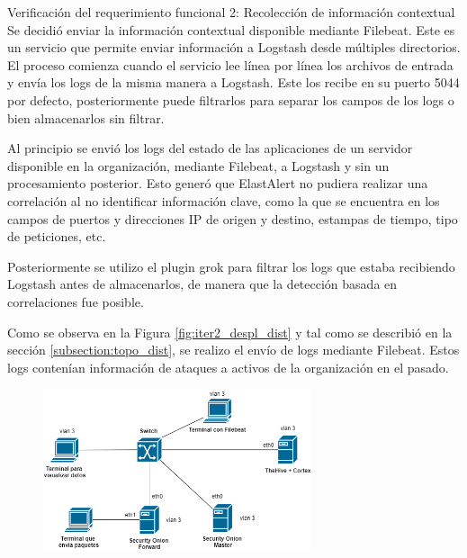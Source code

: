 \begin{section}{Verificación del requerimiento funcional 2: Recolección de información contextual}
    Se decidió enviar la información contextual disponible mediante Filebeat. Este es un servicio que permite enviar información a Logstash desde múltiples directorios. El proceso comienza cuando el servicio lee línea por línea los archivos de entrada y envía los logs de la misma manera a Logstash. Este los recibe en su puerto 5044 por defecto, posteriormente puede filtrarlos para separar los campos de los logs o bien almacenarlos sin filtrar. \par
    Al principio se envió los logs del estado de las aplicaciones de un servidor disponible en la organización, mediante Filebeat, a Logstash y sin un procesamiento posterior. Esto generó que ElastAlert no pudiera realizar una correlación al no identificar información clave, como la que se encuentra en los campos de puertos y direcciones IP de origen y destino, estampas de tiempo, tipo de peticiones, etc.\par
    Posteriormente se utilizo el plugin grok para filtrar los logs que estaba recibiendo Logstash antes de almacenarlos, de manera que la detección basada en correlaciones fue posible.\par
    Como se observa en la Figura \ref{fig:iter2_despl_dist} y tal como se describió en la sección \ref{subsection:topo_dist}, se realizo el envío de logs mediante Filebeat. Estos logs contenían información de ataques a activos de la organización en el pasado. 
    \begin{figure}[H]
    \centering
        \includegraphics[width=0.7\textwidth]{./iteracion_1_imagenes/figura_33_c_topologia_de_prueba_3.png}

\end{figure}
\end{section}
